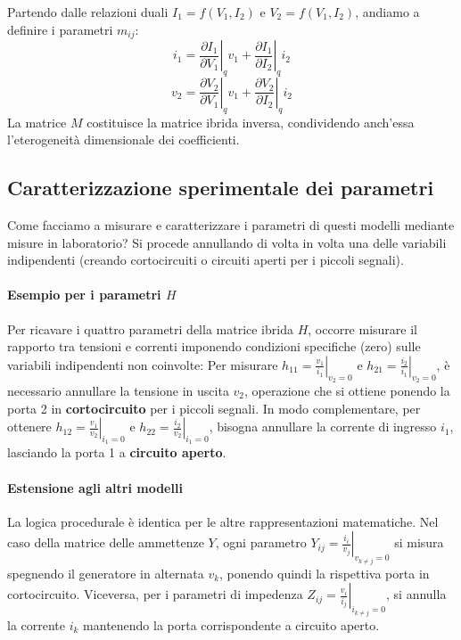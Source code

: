 Partendo dalle relazioni duali $I_1 = f(V_1, I_2)$ e $V_2 = f(V_1, I_2)$, andiamo a definire i parametri $m_{ij}$:
$$ i_1 = \left. \frac{\partial I_1}{\partial V_1} \right|_q v_1 + \left. \frac{\partial I_1}{\partial I_2} \right|_q i_2 $$
$$ v_2 = \left. \frac{\partial V_2}{\partial V_1} \right|_q v_1 + \left. \frac{\partial V_2}{\partial I_2} \right|_q i_2 $$
La matrice $M$ costituisce la matrice ibrida inversa, condividendo anch'essa l'eterogeneità dimensionale dei coefficienti.

\subsection{Caratterizzazione sperimentale dei parametri}
Come facciamo a misurare e caratterizzare i parametri di questi modelli mediante misure in laboratorio?
Si procede annullando di volta in volta una delle variabili indipendenti (creando cortocircuiti o circuiti aperti per i piccoli segnali).

\paragraph{Esempio per i parametri $H$}
Per ricavare i quattro parametri della matrice ibrida $H$, occorre misurare il rapporto tra tensioni e correnti imponendo condizioni specifiche (zero) sulle variabili indipendenti non coinvolte:
Per misurare $h_{11} = \left. \frac{v_1}{i_1} \right|_{v_2=0}$ e $h_{21} = \left. \frac{i_2}{i_1} \right|_{v_2=0}$, è necessario annullare la tensione in uscita $v_2$, operazione che si ottiene ponendo la porta 2 in \textbf{cortocircuito} per i piccoli segnali. 
In modo complementare, per ottenere $h_{12} = \left. \frac{v_1}{v_2} \right|_{i_1=0}$ e $h_{22} = \left. \frac{i_2}{v_2} \right|_{i_1=0}$, bisogna annullare la corrente di ingresso $i_1$, lasciando la porta 1 a \textbf{circuito aperto}.

\paragraph{Estensione agli altri modelli}
La logica procedurale è identica per le altre rappresentazioni matematiche. Nel caso della matrice delle ammettenze $Y$, ogni parametro $Y_{ij} = \left. \frac{i_i}{v_j} \right|_{v_{k \neq j} = 0}$ si misura spegnendo il generatore in alternata $v_k$, ponendo quindi la rispettiva porta in cortocircuito. Viceversa, per i parametri di impedenza $Z_{ij} = \left. \frac{v_i}{i_j} \right|_{i_{k \neq j} = 0}$, si annulla la corrente $i_k$ mantenendo la porta corrispondente a circuito aperto.

